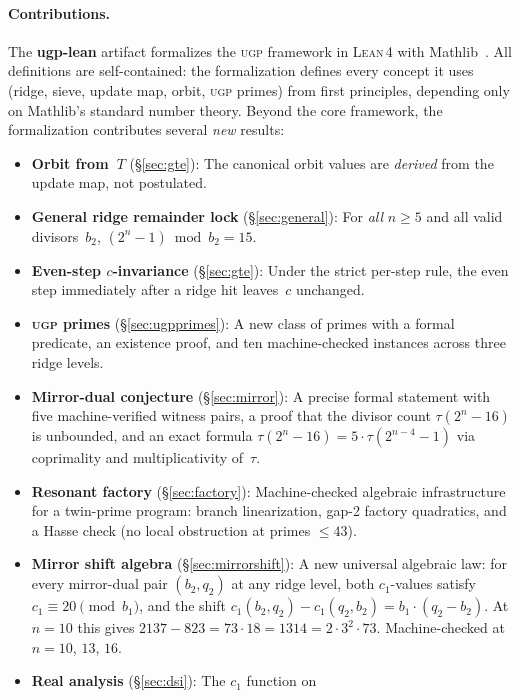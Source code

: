 \documentclass[11pt,a4paper]{article}
\theoremstyle{definition}
\newcommand{\ugp}{\textsc{ugp}}
\newcommand{\lean}{\textsc{Lean}\,4}
\begin{document}
\paragraph{Contributions.}
The \textbf{ugp-lean} artifact formalizes the \ugp{} framework in
\lean{} \cite{deMoura2021} with Mathlib~\cite{mathlib4}.  All
definitions are self-contained: the formalization defines every concept
it uses (ridge, sieve, update map, orbit, \ugp{} primes) from first
principles, depending only on Mathlib's standard number theory.  Beyond
the core framework, the formalization contributes several \emph{new}
results:
\begin{itemize}[nosep]
\item \textbf{Orbit from~$T$} (\S\ref{sec:gte}): The canonical orbit
  values are \emph{derived} from the update map, not postulated.
\item \textbf{General ridge remainder lock} (\S\ref{sec:general}): For
  \emph{all} $n \ge 5$ and all valid divisors~$b_2$,
  $(2^n - 1) \bmod b_2 = 15$.
\item \textbf{Even-step $c$-invariance} (\S\ref{sec:gte}): Under the
  strict per-step rule, the even step immediately after a ridge hit
  leaves~$c$ unchanged.
\item \textbf{\ugp{} primes} (\S\ref{sec:ugpprimes}): A new class of
  primes with a formal predicate, an existence proof, and ten
  machine-checked instances across three ridge levels.
\item \textbf{Mirror-dual conjecture} (\S\ref{sec:mirror}): A precise
  formal statement with five machine-verified witness pairs, a proof
  that the divisor count $\tau(2^n - 16)$ is unbounded, and an exact
  formula $\tau(2^n - 16) = 5 \cdot \tau(2^{n-4} - 1)$ via
  coprimality and multiplicativity of~$\tau$.
\item \textbf{Resonant factory} (\S\ref{sec:factory}): Machine-checked
  algebraic infrastructure for a twin-prime program: branch linearization,
  gap-2 factory quadratics, and a Hasse check (no local obstruction at
  primes $\le 43$).
\item \textbf{Mirror shift algebra} (\S\ref{sec:mirrorshift}): A new
  universal algebraic law: for every mirror-dual pair $(b_2, q_2)$ at
  any ridge level, both $c_1$-values satisfy $c_1 \equiv 20
  \pmod{b_1}$, and the shift $c_1(b_2,q_2) - c_1(q_2,b_2) = b_1
  \cdot (q_2 - b_2)$.  At $n=10$ this gives $2137 - 823 = 73 \cdot 18
  = 1314 = 2 \cdot 3^2 \cdot 73$.  Machine-checked at $n=10$, $13$, $16$.
\item \textbf{Real analysis} (\S\ref{sec:dsi}): The $c_1$ function on

\end{itemize}
\end{document}
